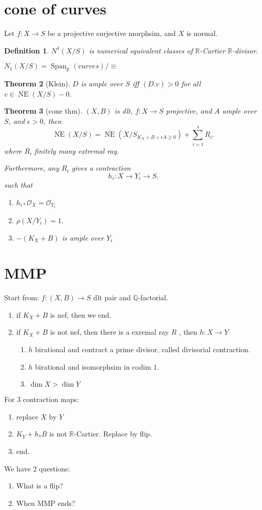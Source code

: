 \documentclass{article}
\newtheorem{defn}{Definition}[section]
\newtheorem{thm}[defn]{Theorem}
\begin{document}
\section{cone of curves}
Let $f:X\to S$ be a projective surjective morphsim, and $X$ is normal.
\begin{defn}
  $N^1(X /S)$ is numerical equivalent classes of $\mathbb{R}$-Cartier $\mathbb{R}$-divisor.

  $N_1(X /S)= \operatorname{Span}_{\mathbb{R}}(curves) /\equiv$ 

\end{defn}
\begin{thm}[Klein]
 $D$ is ample over $S$ iff $(D.v)>0$ for all $v \in \overline{\operatorname{NE}} (X /S)-0$.    
\end{thm}
\begin{thm}[cone thm]
  $(X,B)$ is dlt, $f:X\to S$ projective, and $A$ ample over $S$, and $\epsilon>0$, then 
  \[
    \overline{\operatorname{NE}}(X /S) = \overline{\operatorname{NE}}(X /S_{K_{X}+B+\epsilon A\geqslant 0}) + \sum^{s}_{i=1} R_{i}
  .\]
 where $R_{i}$ finitely many extremal ray.

 Furthermore, any $R_{i}$ gives a contraction
 \[
   h_{i}:X\to Y_{i} \to S
 .\]
such that 
\begin{enumerate}
  \item $h_{i*} \mathcal{O}_{X}=\mathcal{O}_{Y_{i}}$
  \item $\rho(X /Y_{i})=1$.
  \item $-(K_{X}+B)$ is ample over $Y_{i}$ 
\end{enumerate}
\end{thm}
\section{MMP}
 Start from: $f:(X,B)\to S$ dlt pair and $\mathbb{Q}$-factorial.
 \begin{enumerate}
   \item if $K_{X}+B$ is nef, then we end.
   \item if $K_{X}+B$ is not nef, then there is a exremal ray $R$ , then $h:X\to Y$
     \begin{enumerate}[a]
       \item $h$ birational and contract a prime divisor, called divisorial contraction.
       \item $h$ birational and isomorphsim in codim $1$.
       \item $\dim X >\dim Y$
     \end{enumerate}
 \end{enumerate}
 For 3 contraction maps:
 \begin{enumerate}[a]
   \item  replace $X$  by $Y$
   \item  $K_{Y}+ h_*B $ is not $\mathbb{R}$-Cartier. Replace by flip.
   \item end.
 \end{enumerate}
 We have 2 questions:
 \begin{enumerate}
   \item What is a flip?
   \item When MMP ends?
 \end{enumerate}
\end{document}
